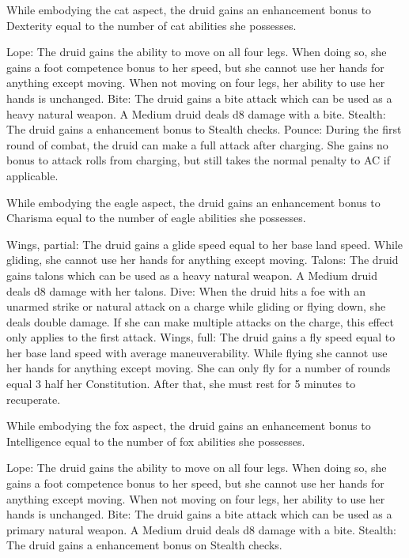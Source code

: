 While embodying the cat aspect, the druid gains an enhancement bonus to Dexterity equal to the number of cat abilities she possesses.
\begin{wildaspect}
\wilditem Lope: The druid gains the ability to move on all four legs. When doing so, she gains a  foot competence bonus to her speed, but she cannot use her hands for anything except moving. When not moving on four legs, her ability to use her hands is unchanged.
\wilditem Bite: The druid gains a bite attack which can be used as a heavy natural weapon. A Medium druid deals d8 damage with a bite.
\wilditem Stealth: The druid gains a  enhancement bonus to Stealth checks.
\wilditem Pounce: During the first round of combat, the druid can make a full attack after charging. She gains no bonus to attack rolls from charging, but still takes the normal penalty to AC if applicable.
\end{wildaspect}

While embodying the eagle aspect, the druid gains an enhancement bonus to Charisma equal to the number of eagle abilities she possesses.
\begin{wildaspect}
\wilditem Wings, partial: The druid gains a glide speed equal to her base land speed. While gliding, she cannot use her hands for anything except moving.
\wilditem Talons: The druid gains talons which can be used as a heavy natural weapon. A Medium druid deals d8 damage with her talons.
\wilditem Dive: When the druid hits a foe with an unarmed strike or natural attack on a charge while gliding or flying down, she deals double damage. If she can make multiple attacks on the charge, this effect only applies to the first attack.
\wilditem Wings, full: The druid gains a fly speed equal to her base land speed with average maneuverability. While flying she cannot use her hands for anything except moving. She can only fly for a number of rounds equal 3 \add half her Constitution. After that, she must rest for 5 minutes to recuperate.
\end{wildaspect}

While embodying the fox aspect, the druid gains an enhancement bonus to Intelligence equal to the number of fox abilities she possesses.
\begin{wildaspect}
\wilditem Lope: The druid gains the ability to move on all four legs. When doing so, she gains a  foot competence bonus to her speed, but she cannot use her hands for anything except moving. When not moving on four legs, her ability to use her hands is unchanged.
\wilditem Bite: The druid gains a bite attack which can be used as a primary natural weapon. A Medium druid deals d8 damage with a bite.
\wilditem Stealth: The druid gains a  enhancement bonus on Stealth checks.
\wilditem
\end{wildaspect}

